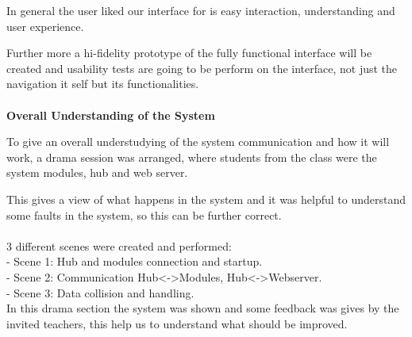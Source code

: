 In general the user liked our interface for is easy interaction, understanding and user experience.

Further more a hi-fidelity prototype of the fully functional interface will be created and usability tests are going to be perform on the interface, not just the navigation it self but its functionalities.
\\
\\\textbf{Overall Understanding of the System} 

To give an overall understudying of the system communication and how it will work, a drama session was arranged, where students from the class were the system modules, hub and web server.

This gives a view of what happens in the system and it was helpful to understand some faults in the system, so this can be further correct.
\\
\\3 different scenes were created and performed:\\
- Scene 1: Hub and modules connection and startup.\\
- Scene 2: Communication Hub<->Modules, Hub<->Webserver.\\
- Scene 3: Data collision and handling.\\

In this drama section the system was shown and some feedback was gives by the invited teachers, this help us to understand what should be improved.